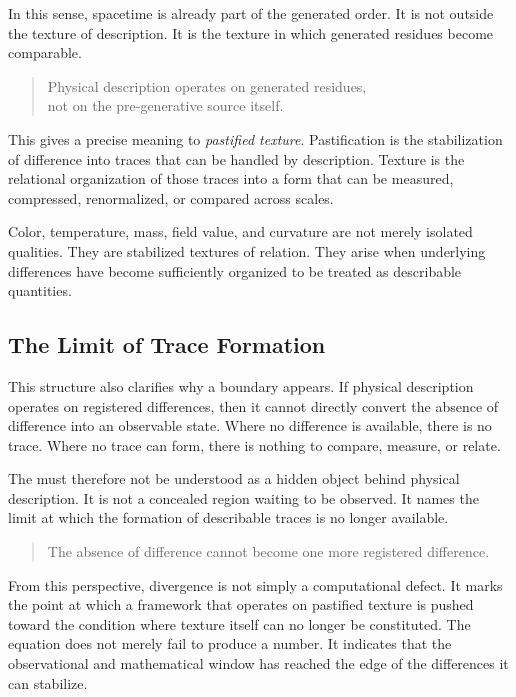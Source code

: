 In this sense,
spacetime is already part of the generated order.
It is not outside the texture of description.
It is the texture in which generated residues become comparable.

\medskip
\begin{quote}
Physical description operates on generated residues,\\
not on the pre-generative source itself.
\end{quote}
\medskip

This gives a precise meaning to \textit{pastified texture}.
Pastification is the stabilization of difference into traces that can
be handled by description.
Texture is the relational organization of those traces into a form that
can be measured,
compressed,
renormalized,
or compared across scales.

Color,
temperature,
mass,
field value,
and curvature are not merely isolated qualities.
They are stabilized textures of relation.
They arise when underlying differences have become sufficiently
organized to be treated as describable quantities.

\subsection*{The Limit of Trace Formation}

This structure also clarifies why a boundary appears.
If physical description operates on registered differences,
then it cannot directly convert the absence of difference into an
observable state.
Where no difference is available,
there is no trace.
Where no trace can form,
there is nothing to compare,
measure,
or relate.

The \ungenerated{} must therefore not be understood as a hidden object
behind physical description.
It is not a concealed region waiting to be observed.
It names the limit at which the formation of describable traces is no
longer available.

\medskip
\begin{quote}
The absence of difference cannot become one more registered
difference.
\end{quote}
\medskip

From this perspective,
divergence is not simply a computational defect.
It marks the point at which a framework that operates on pastified
texture is pushed toward the condition where texture itself can no
longer be constituted.
The equation does not merely fail to produce a number.
It indicates that the observational and mathematical window has reached
the edge of the differences it can stabilize.

